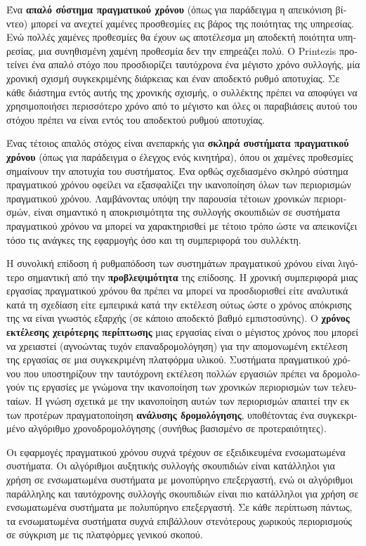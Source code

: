 \begin{greek}
Ένα \textbf{απαλό σύστημα πραγματικού χρόνου} (όπως για παράδειγμα
η απεικόνιση βίντεο) μπορεί να ανεχτεί χαμένες προσθεσμίες εις
βάρος της ποιότητας της υπηρεσίας. Ενώ πολλές χαμένες προθεσμίες
θα έχουν ως αποτέλεσμα μη αποδεκτή ποιότητα υπηρεσίας, μια
συνηθισμένη χαμένη προθεσμία δεν την επηρεάζει πολύ. Ο Printezis
\cite{DBLP:journals/scp/Printezis06} προτείνει ένα απαλό στόχο
που προσδιορίζει ταυτόχρονα ένα μέγιστο χρόνο συλλογής, μία χρονική
σχισμή συγκεκριμένης διάρκειας και έναν αποδεκτό ρυθμό αποτυχίας.
Σε κάθε διάστημα εντός αυτής της χρονικής σχισμής, ο συλλέκτης
πρέπει να αποφύγει να χρησιμοποιήσει περισσότερο χρόνο από το
μέγιστο και όλες οι παραβιάσεις αυτού του στόχου πρέπει να είναι
εντός του αποδεκτού ρυθμού αποτυχίας. 

Ένας τέτοιος απαλός στόχος είναι ανεπαρκής για \textbf{σκληρά
συστήματα πραγματικού χρόνου} (όπως για παράδειγμα ο έλεγχος
ενός κινητήρα), όπου οι χαμένες προθεσμίες σημαίνουν την αποτυχία
του συστήματος. Ένα ορθώς σχεδιασμένο σκληρό σύστημα πραγματικού
χρόνου οφείλει να εξασφαλίζει την ικανοποίηση όλων των περιορισμών
πραγματικού χρόνου. Λαμβάνοντας υπόψη την παρουσία τέτοιων χρονικών
περιορισμών, είναι σημαντικό η αποκρισιμότητα της συλλογής
σκουπιδιών σε συστήματα πραγματικού χρόνου να μπορεί να χαρακτηρισθεί
με τέτοιο τρόπο ώστε να απεικονίζει τόσο τις ανάγκες της εφαρμογής
όσο και τη συμπεριφορά του συλλέκτη.

Η συνολική επίδοση ή ρυθμαπόδοση των συστημάτων πραγματικού χρόνου
είναι λιγότερο σημαντική από την \textbf{προβλεψιμότητα} της
επίδοσης. Η χρονική συμπεριφορά μιας εργασίας πραγματικού χρόνου
θα πρέπει να μπορεί να προσδιορισθεί είτε αναλυτικά κατά τη
σχεδίαση είτε εμπειρικά κατά την εκτέλεση ούτως ώστε ο χρόνος
απόκρισης της να είναι γνωστός εξαρχής (σε κάποιο αποδεκτό
βαθμό εμπιστοσύνης). Ο \textbf{χρόνος εκτέλεσης χειρότερης περίπτωσης}
μιας εργασίας είναι ο μέγιστος χρόνος που μπορεί να χρειαστεί
(αγνοώντας τυχόν επαναδρομολόγηση) για την απομονωμένη εκτέλεση
της εργασίας σε μια συγκεκριμένη πλατφόρμα υλικού. Συστήματα πραγματικού
χρόνου που υποστηρίζουν την ταυτόχρονη εκτέλεση πολλών εργασιών
πρέπει να δρομολογούν τις εργασίες με γνώμονα την ικανοποίηση
των χρονικών περιορισμών των τελευταίων. Η γνώση σχετικά με
την ικανοποίηση αυτών των περιορισμών απαιτεί την εκ των
προτέρων πραγματοποίηση \textbf{ανάλυσης δρομολόγησης}, υποθέτοντας
ένα συγκεκριμένο αλγόριθμο χρονοδρομολόγησης (συνήθως βασισμένο
σε προτεραιότητες).

Οι εφαρμογές πραγματικού χρόνου συχνά τρέχουν σε εξειδικευμένα
ενσωματωμένα συστήματα. Οι αλγόριθμοι αυξητικής συλλογής
σκουπιδιών είναι κατάλληλοι για χρήση σε ενσωματωμένα συστήματα
με μονοπύρηνο επεξεργαστή, ενώ οι αλγόριθμοι παράλληλης και
ταυτόχρονης συλλογής σκουπιδιών είναι πιο κατάλληλοι για χρήση
σε ενσωματωμένα συστήματα με πολυπύρηνο επεξεργαστή. Σε κάθε
περίπτωση πάντως, τα ενσωματωμένα συστήματα συχνά επιβάλλουν
στενότερους χωρικούς περιορισμούς σε σύγκριση με τις πλατφόρμες
γενικού σκοπού.


\end{greek}
